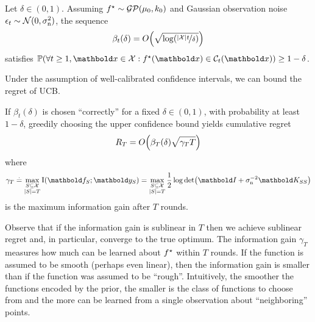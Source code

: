 \begin{thm}\label{thm:bayesian_confidence_intervals} 
  Let $\delta \in (0,1)$.
  Assuming $\opt{f} \sim \GP{\mu_0}{k_0}$ and Gaussian observation noise $\epsilon_t \sim \N{0}{\sigman^2}$, the sequence \begin{align}
    \beta_t(\delta) = \BigO{\sqrt{\log\parentheses*{\nicefrac{\card{\spX} t}{\delta}}}}
  \end{align} satisfies $\Pr{\forall t \geq 1, \vx \in \spX : \opt{f}(\vx) \in \spC_t(\vx)} \geq 1 - \delta$.
\end{thm}

Under the assumption of well-calibrated confidence intervals, we can bound the regret of UCB.

\begin{thm}\label{thm:bayesian_regret_for_gp_ucb} 
  If $\beta_t(\delta)$ is chosen ``correctly'' for a fixed $\delta \in (0,1)$, with probability at least $1-\delta$, greedily choosing the upper confidence bound yields cumulative regret \begin{align}
    R_T = \BigO{\beta_T(\delta) \sqrt{\gamma_T T}} \label{eq:ucb_regret}
  \end{align} where \begin{align}
    \gamma_T \defeq \max_{\substack{\sS \subseteq \spX \\ \card{\sS} = T}} \I{\vf_\sS}{\vy_\sS} = \max_{\substack{\sS \subseteq \spX \\ |\sS| = T}} \frac{1}{2} \log\det{\mI + \sigman^{-2} \mK_{\sS\sS}} \label{eq:gamma_t}
  \end{align} is the maximum information gain after $T$ rounds.
\end{thm}

Observe that if the information gain is sublinear in $T$ then we achieve sublinear regret and, in particular, converge to the true optimum.
The information gain $\gamma_T$ measures how much can be learned about $f^\star$ within $T$ rounds.
If the function is assumed to be smooth (perhaps even linear), then the information gain is smaller than if the function was assumed to be ``rough''.
Intuitively, the smoother the functions encoded by the prior, the smaller is the class of functions to choose from and the more can be learned from a single observation about ``neighboring'' points.

